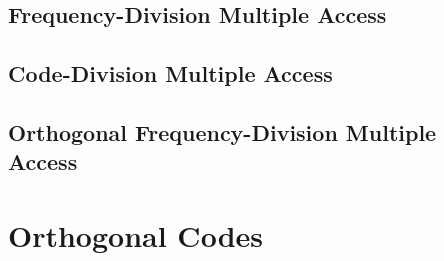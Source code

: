 \begin{refsection}
\subsection{Frequency-Division Multiple Access}

\subsection{Code-Division Multiple Access}

\subsection{Orthogonal Frequency-Division Multiple Access}

\section{Orthogonal Codes}

\nocite{ipatov2005}

{}
\printbibliography[heading=subbibliography]
\end{refsection}

